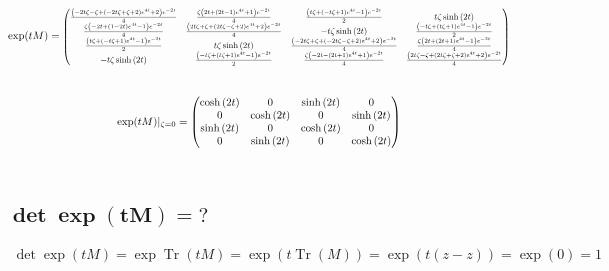 \documentclass[10pt,a4paper]{article}
\newcommand{\mat}[1]{
    \begin{pmatrix}
        #1
    \end{pmatrix}
}
\newcommand{\Tr}{\operatorname{Tr}}
\begin{document}
\begin{gather*}
    \exp(tM) = \scalebox{0.8}{$\mat{\frac{\left(- 2 t \zeta - \zeta + \left(- 2 t \zeta + \zeta + 2\right) e^{4 t} + 2\right) e^{- 2 t}}{4} & \frac{\zeta \left(2 t + \left(2 t - 1\right) e^{4 t} + 1\right) e^{- 2 t}}{4} & \frac{\left(t \zeta + \left(- t \zeta + 1\right) e^{4 t} - 1\right) e^{- 2 t}}{2} & t \zeta \sinh{\left(2 t \right)}\\\frac{\zeta \left(- 2 t + \left(1 - 2 t\right) e^{4 t} - 1\right) e^{- 2 t}}{4} & \frac{\left(2 t \zeta + \zeta + \left(2 t \zeta - \zeta + 2\right) e^{4 t} + 2\right) e^{- 2 t}}{4} & - t \zeta \sinh{\left(2 t \right)} & \frac{\left(- t \zeta + \left(t \zeta + 1\right) e^{4 t} - 1\right) e^{- 2 t}}{2}\\\frac{\left(t \zeta + \left(- t \zeta + 1\right) e^{4 t} - 1\right) e^{- 2 t}}{2} & t \zeta \sinh{\left(2 t \right)} & \frac{\left(- 2 t \zeta + \zeta + \left(- 2 t \zeta - \zeta + 2\right) e^{4 t} + 2\right) e^{- 2 t}}{4} & \frac{\zeta \left(2 t + \left(2 t + 1\right) e^{4 t} - 1\right) e^{- 2 t}}{4}\\- t \zeta \sinh{\left(2 t \right)} & \frac{\left(- t \zeta + \left(t \zeta + 1\right) e^{4 t} - 1\right) e^{- 2 t}}{2} & \frac{\zeta \left(- 2 t - \left(2 t + 1\right) e^{4 t} + 1\right) e^{- 2 t}}{4} & \frac{\left(2 t \zeta - \zeta + \left(2 t \zeta + \zeta + 2\right) e^{4 t} + 2\right) e^{- 2 t}}{4}}$}
    \\[25pt]
    \exp(tM) |_{\zeta=0} = \mat{\cosh{\left(2 t \right)} & 0 & \sinh{\left(2 t \right)} & 0\\0 & \cosh{\left(2 t \right)} & 0 & \sinh{\left(2 t \right)}\\\sinh{\left(2 t \right)} & 0 & \cosh{\left(2 t \right)} & 0\\0 & \sinh{\left(2 t \right)} & 0 & \cosh{\left(2 t \right)}}
    \\[25pt]
\end{gather*}

\subsection{
    \texorpdfstring{
        $\pmb{ \det\exp(tM) = \mathit{?} }$
    }{
        det exp(tM) = ?
    }
}
\begin{gather*}
    \det \exp(tM) = \exp \Tr(tM) =
    \exp\left( t \Tr(M) \right) =
    \exp\left( t \left(z-z\right) \right) =
    \exp(0) = 1
\end{gather*}
\end{document}
